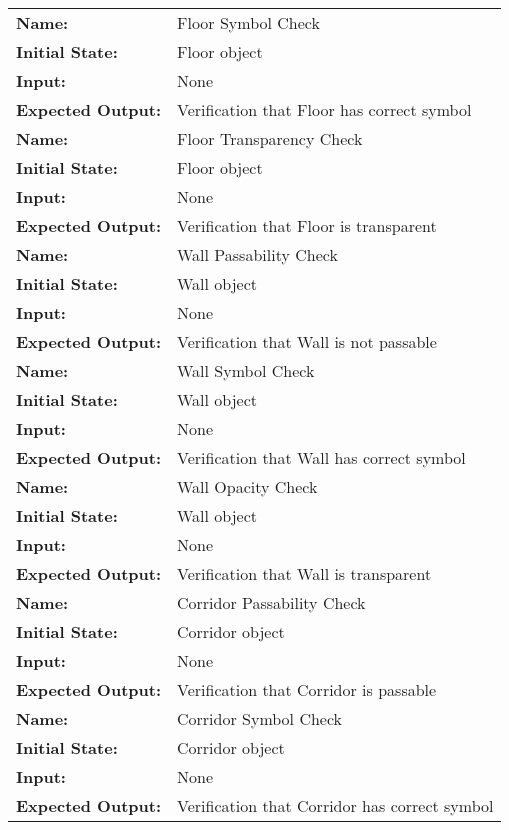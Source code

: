 \documentclass[12pt, titlepage]{article}
\begin{document}
\begin{center}
\begin{longtable}{ l | p{10cm} }
				\hline
				\rule{0pt}{1.5em}\textbf{Name:} & Floor Symbol Check\\
				\textbf{Initial State:} & Floor object\\
				\textbf{Input:} & None\\
				\textbf{Expected Output:} & Verification that Floor has correct symbol\\[0.6em]
				\hline
				\rule{0pt}{1.5em}\textbf{Name:} & Floor Transparency Check\\
				\textbf{Initial State:} & Floor object\\
				\textbf{Input:} & None\\
				\textbf{Expected Output:} & Verification that Floor is transparent\\[0.6em]
				\hline
				\rule{0pt}{1.5em}\textbf{Name:} & Wall Passability Check\\
				\textbf{Initial State:} & Wall object\\
				\textbf{Input:} & None\\
				\textbf{Expected Output:} & Verification that Wall is not passable\\[0.6em]
				\hline
				\rule{0pt}{1.5em}\textbf{Name:} & Wall Symbol Check\\
				\textbf{Initial State:} & Wall object\\
				\textbf{Input:} & None\\
				\textbf{Expected Output:} & Verification that Wall has correct symbol\\[0.6em]
				\hline
				\rule{0pt}{1.5em}\textbf{Name:} & Wall Opacity Check\\
				\textbf{Initial State:} & Wall object\\
				\textbf{Input:} & None\\
				\textbf{Expected Output:} & Verification that Wall is transparent\\[0.6em]
				\rule{0pt}{1.5em}\textbf{Name:} & Corridor Passability Check\\
				\textbf{Initial State:} & Corridor object\\
				\textbf{Input:} & None\\
				\textbf{Expected Output:} & Verification that Corridor is passable\\[0.6em]
				\hline
				\rule{0pt}{1.5em}\textbf{Name:} & Corridor Symbol Check\\
				\textbf{Initial State:} & Corridor object\\
				\textbf{Input:} & None\\
				\textbf{Expected Output:} & Verification that Corridor has correct symbol\\[0.6em]

\end{longtable}
\end{center}
\end{document}
